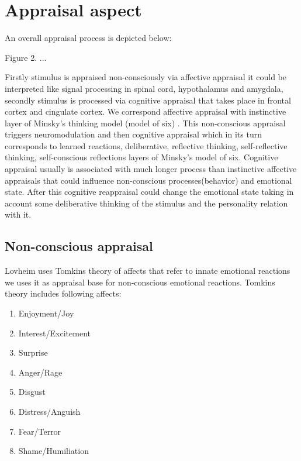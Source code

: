 \section{Appraisal aspect}


An overall appraisal process is depicted below:

\begin{center}
Figure 2. ...
\end{center}

Firstly stimulus is appraised non-consciously via affective appraisal it could be interpreted like signal processing in spinal cord, hypothalamus and amygdala, secondly stimulus is processed via cognitive appraisal that takes place in frontal cortex and cingulate cortex. We correspond affective appraisal with instinctive layer of Minsky's thinking model (model of six) \cite{emotionmachine}. This non-conscious appraisal triggers neuromodulation \cite{cubeofemotions} and then cognitive appraisal which in its turn corresponds to learned reactions, deliberative, reflective thinking, self-reflective thinking, self-conscious reflections layers of Minsky's model of six. Cognitive appraisal usually is associated with much longer process than instinctive affective appraisals that could influence non-conscious processes(behavior) and emotional state. After this cognitive reappraisal could change the emotional state taking in account some deliberative thinking of the stimulus and the personality relation with it.

\subsection{Non-conscious appraisal}

Lovheim uses Tomkins theory of affects that refer to innate emotional reactions we uses it as appraisal base for non-conscious emotional reactions. Tomkins theory \cite{tomkins1, tomkins2, tomkins3, quest} includes following affects:

\begin{enumerate}
 \item  Enjoyment/Joy
 \item  Interest/Excitement
 \item  Surprise
 \item  Anger/Rage
 \item  Disgust
 \item  Distress/Anguish
 \item  Fear/Terror
 \item  Shame/Humiliation
\end{enumerate}

